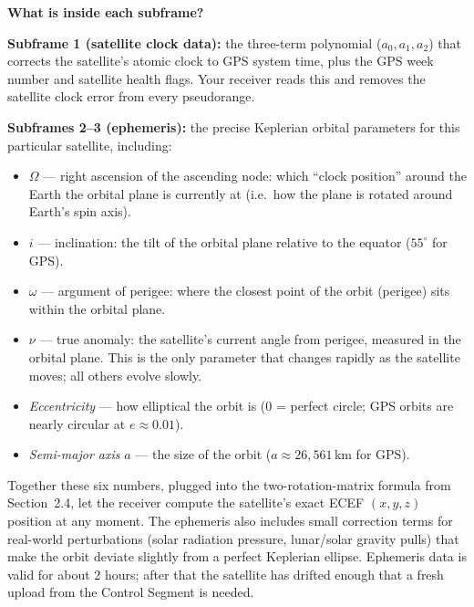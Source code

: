 \documentclass[12pt, a4paper]{article}
\begin{document}
\begin{notebox}
  \textbf{What is inside each subframe?}

  \textbf{Subframe 1 (satellite clock data):} the three-term polynomial
  ($a_0, a_1, a_2$) that corrects the satellite's atomic clock to GPS system
  time, plus the GPS week number and satellite health flags.
  Your receiver reads this and removes the satellite clock error from every
  pseudorange.

  \textbf{Subframes 2--3 (ephemeris):} the precise Keplerian orbital
  parameters for this particular satellite, including:
  \begin{itemize}[leftmargin=1.5em, itemsep=1pt]
    \item $\Omega$ --- right ascension of the ascending node: which
      ``clock position'' around the Earth the orbital plane is currently
      at (i.e.\ how the plane is rotated around Earth's spin axis).
    \item $i$ --- inclination: the tilt of the orbital plane relative to
      the equator ($55^\circ$ for GPS).
    \item $\omega$ --- argument of perigee: where the closest point of
      the orbit (perigee) sits within the orbital plane.
    \item $\nu$ --- true anomaly: the satellite's current angle from
      perigee, measured in the orbital plane.
      This is the only parameter that changes rapidly as the satellite
      moves; all others evolve slowly.
    \item \emph{Eccentricity} --- how elliptical the orbit is
      (0 = perfect circle; GPS orbits are nearly circular at
      $e \approx 0.01$).
    \item \emph{Semi-major axis} $a$ --- the size of the orbit
      ($a \approx 26{,}561$\,km for GPS).
  \end{itemize}
  Together these six numbers, plugged into the two-rotation-matrix formula
  from Section~2.4, let the receiver compute the satellite's exact ECEF
  $(x, y, z)$ position at any moment.
  The ephemeris also includes small correction terms for real-world
  perturbations (solar radiation pressure, lunar/solar gravity pulls) that
  make the orbit deviate slightly from a perfect Keplerian ellipse.
  Ephemeris data is valid for about 2 hours; after that the satellite has
  drifted enough that a fresh upload from the Control Segment is needed.


\end{notebox}
\end{document}
